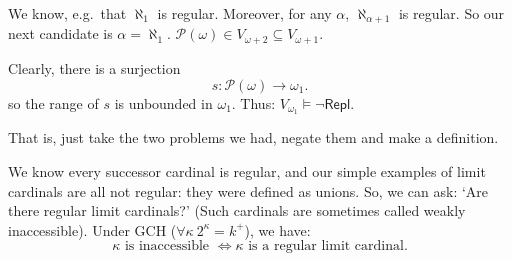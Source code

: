 \documentclass{article}
\newcommand{\named}[1]{\textbf{#1}\index{#1}}
\let\models\vDash
\begin{document}
We know, e.g.\ that $\aleph_1$ is regular. Moreover, for any $\alpha$, $\aleph_{\alpha+1}$ is regular.
So our next candidate is $\alpha = \aleph_1$. $\mathcal{P}(\omega) \in V_{\omega+2} \subseteq V_{\omega+1}$.
\begin{center}
\end{center}
Clearly, there is a surjection
\begin{equation*}
  s: \mathcal{P}(\omega) \to \omega_1.
\end{equation*}
so the range of $s$ is unbounded in $\omega_1$.
Thus: $V_{\omega_1} \models \neg\textsf{Repl}$.

That is, just take the two problems we had, negate them and make a definition.

\begin{remark}
  We know every successor cardinal is regular, and our simple examples of limit cardinals are all not regular: they were defined as unions.
  So, we can ask: `Are there regular limit cardinals?'
  (Such cardinals are sometimes called weakly inaccessible).
  Under GCH ($\forall \kappa\ 2^\kappa = k^+$), we have:
  \begin{equation*}
    \kappa \text{ is inaccessible } \iff \kappa \text{ is a regular limit cardinal}.
  \end{equation*}
\end{remark}
\end{document}
